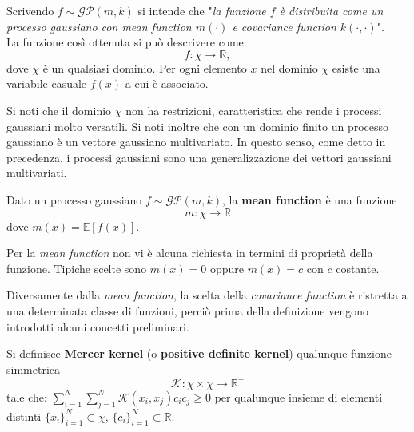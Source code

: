 \begin{nota}
Scrivendo $f\sim \mathcal{GP}(m,k)$ si  intende che "\textit{la funzione $f$ è distribuita come un processo gaussiano con mean function $m(\cdot)$ e covariance function $k(\cdot,\cdot)$}".\\
La funzione così ottenuta si può descrivere come:
\[f: \chi \rightarrow \mathbb{R},\]
dove $\chi$ è un qualsiasi dominio. Per ogni elemento $x$ nel dominio $\chi$ esiste una variabile casuale $f(x)$ a cui è associato.
\end{nota}



\begin{oss} \label{oss1}
Si noti che il dominio $\chi$ non ha restrizioni, caratteristica che rende i processi gaussiani molto versatili. Si noti inoltre che con un dominio finito un processo gaussiano è un vettore gaussiano multivariato. In questo senso, come detto in precedenza, i processi gaussiani sono una generalizzazione dei vettori gaussiani multivariati. 
\end{oss}


\newpage
\begin{defi}
Dato un processo gaussiano $f\sim \mathcal{GP}(m,k)$, la \textbf{mean function} è una funzione
\[
m:\chi \rightarrow \mathbb{R}
\]
dove $m(x)=\mathbb{E}[f(x)]$.
\end{defi}

\begin{oss}
Per la \textit{mean function} non vi è alcuna richiesta in termini di proprietà della funzione. Tipiche scelte sono $m(x)=0$ oppure $m(x)=c$ con $c$ costante.
\end{oss}

Diversamente dalla \textit{mean function}, la scelta della \textit{covariance function} è ristretta a una determinata classe di funzioni, perciò prima della definizione vengono introdotti alcuni concetti preliminari.




\begin{defi}
Si definisce \textbf{Mercer kernel} (o \textbf{positive definite kernel}) qualunque funzione simmetrica 
\[
\mathcal{K}: \chi\times\chi \rightarrow \mathbb{R}^+
\]
 tale che: $\sum_{i=1}^N\sum_{j=1}^N\mathcal{K}(x_i,x_j)c_ic_j \geq 0$ per qualunque insieme di elementi distinti $\{x_i\}_{i=1}^N\subset \chi$, $\{c_i\}_{i=1}^N\subset  \mathbb{R}$.
\end{defi}

